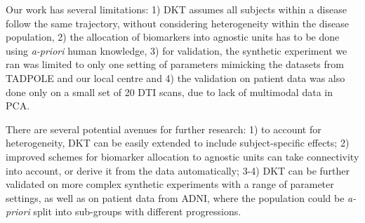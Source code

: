 \documentclass{llncs}
\begin{document}
% 

Our work has several limitations: 1) DKT assumes all subjects within a disease follow the same trajectory, without considering heterogeneity within the disease population, 2) the allocation of biomarkers into agnostic units has to be done using \emph{a-priori} human knowledge, 3) for validation, the synthetic experiment we ran was limited to only one setting of parameters mimicking the datasets from TADPOLE and our local centre and 4) the validation on patient data was also done only on a small set of 20 DTI scans, due to lack of multimodal data in PCA.

There are several potential avenues for further research: 1) to account for heterogeneity, DKT can be easily extended to include subject-specific effects; 2) improved schemes for biomarker allocation to agnostic units can take connectivity into account, or derive it from the data automatically; 3-4) DKT can be further validated on more complex synthetic experiments with a range of parameter settings, as well as on patient data from ADNI, where the population could be \emph{a-priori} split into sub-groups with different progressions.

\end{document}
